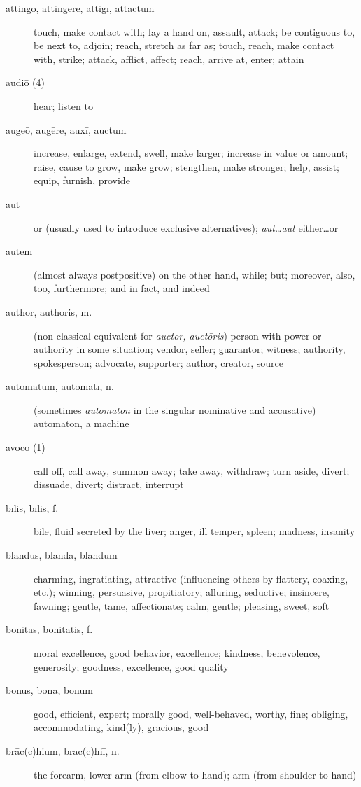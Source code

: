 \begin{description}
    \item[attingō, attingere, attigī, attactum] touch, make contact with; lay a hand on, assault, attack; be contiguous to, be next to, adjoin; reach, stretch as far as; touch, reach, make contact with, strike; attack, afflict, affect; reach, arrive at, enter; attain
    \item[audiō (4)] \marginnote{*}hear; listen to
    \item[augeō, augēre, auxī, auctum] \marginnote{*}increase, enlarge, extend, swell, make larger; increase in value or amount; raise, cause to grow, make grow; stengthen, make stronger; help, assist; equip, furnish, provide
    \item[aut] \marginnote{*}or (usually used to introduce exclusive alternatives); \textit{aut\dots aut} either\dots or
    \item[autem] \marginnote{*}(almost always postpositive) on the other hand, while; but; moreover, also, too, furthermore; and in fact, and indeed
    \item[author, authoris, m.] (non-classical equivalent for \textit{auctor, auctōris}) person with power or authority in some situation; vendor, seller; guarantor; witness; authority, spokesperson; advocate, supporter; author, creator, source
    \item[automatum, automatī, n.] (sometimes \textit{automaton} in the singular nominative and accusative) automaton, a machine
    \item[āvocō (1)] call off, call away, summon away; take away, withdraw; turn aside, divert; dissuade, divert; distract, interrupt
    \item[bīlis, bīlis, f.]  bile, fluid secreted by the liver; anger, ill temper, spleen; madness, insanity
    \item[blandus, blanda, blandum] charming, ingratiating, attractive (influencing others by flattery, coaxing, etc.); winning, persuasive, propitiatory; alluring, seductive; insincere, fawning; gentle, tame, affectionate; calm, gentle; pleasing, sweet, soft
    \item[bonitās, bonitātis, f.] moral excellence, good behavior, excellence; kindness, benevolence, generosity; goodness, excellence, good quality
    \item[bonus, bona, bonum] \marginnote{*}good, efficient, expert; morally good, well-behaved, worthy, fine; obliging, accommodating, kind(ly), gracious, good
    \item[brāc(c)hium, brac(c)hiī, n.]  the forearm, lower arm (from elbow to hand); arm (from shoulder to hand)

\end{description}

